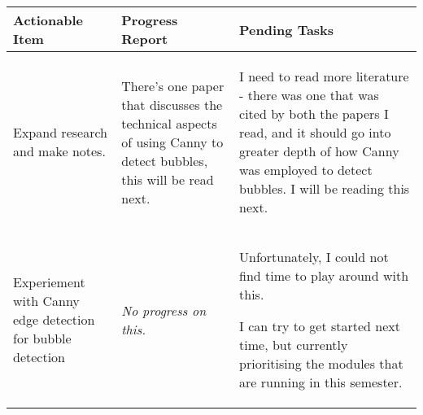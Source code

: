 \begin{table}[!h]
    \centering
    \begin{tabularx}{\textwidth}{|X|X|X|}
        \hline
        Actionable Item & Progress Report & Pending Tasks \\
        \hline
        \hline
        Expand research and make notes. & 
        \begin{myitemize}
            \item There's one paper that discusses the technical aspects of using Canny to detect bubbles, this will be read next.
        \end{myitemize} & 
        \begin{myitemize}
            \item I need to read more literature - there was one that was cited by both the papers I read, and it should go into greater depth of how Canny was employed to detect bubbles. I will be reading this next.
        \end{myitemize} \\
        \hline
        Experiement with Canny edge detection for bubble detection & 
        \textit{No progress on this.} & 
        \begin{myitemize}
            \item Unfortunately, I could not find time to play around with this.
            \item I can try to get started next time, but currently prioritising the modules that are running in this semester.
        \end{myitemize} \\
        \hline
    \end{tabularx}
\end{table}
